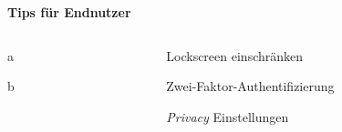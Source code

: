 \begin{frame}
	\centering
	\textbf{Tips für Endnutzer}
	\begin{columns}[T] %
    	
    	\begin{column}[T]{5cm} %
    		\begin{block}{}
				a
			\end{block}
			\begin{block}{}
				b
			\end{block}
    	\end{column}
    	
    	\begin{column}[T]{5cm} %
    		\begin{block}{}
				Lockscreen einschränken
			\end{block}
			\begin{block}{}
				Zwei-Faktor-Authentifizierung
			\end{block}
			\begin{block}{}
				\textsl{Privacy} Einstellungen
			\end{block}
    	\end{column}	
    	
    \end{columns}
\end{frame}